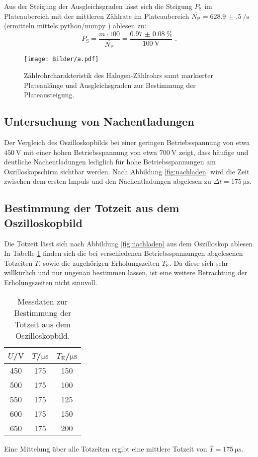 Aus der Steigung der Ausgleichsgraden lässt sich die Steigung $P_\mathrm{S}$ im Plateaubereich mit der mittleren Zählrate im Plateaubereich $\overline{N_\mathrm{P}}=\SI{628.9(5)}{\per\second}$ (ermitteln mittels python/numpy \cite{numpy}) ablesen zu:
\begin{equation*}
  P_\mathrm{S}=\frac{m \cdot 100} {\overline{N_\mathrm{P}}}= \frac{\SI{0.97(8)}{\percent}}{\SI{100}{\volt}}\text{ .}
\end{equation*}
\begin{figure}
  \centering
  \texttt{[image: Bilder/a.pdf]}
  \caption{Zählrohrcharakteristik des Halogen-Zählrohrs samt markierter Plateaulänge und Ausgleichsgraden zur Bestimmung der Plateausteigung.}
  \label{fig:a}
\end{figure}
\FloatBarrier

\subsection{Untersuchung von Nachentladungen}
Der Vergleich des Oszilloskopbilds bei einer geringen Betriebsspannung von etwa $\SI{450}{\volt}$ mit einer hohen Betriebsspannung von etwa $\SI{700}{\volt}$ zeigt, dass häufige und deutliche Nachentladungen lediglich für hohe Betriebsspannungen am Oszilloskopschirm sichtbar werden.
Nach Abbildung \ref{fig:nachladen} wird die Zeit zwischen dem ersten Impuls und den Nachentladungen abgelesen zu $\Delta t=\SI{175}{\micro\second}$.


\subsection{Bestimmung der Totzeit aus dem Oszilloskopbild}
Die Totzeit lässt sich nach Abbildung \ref{fig:nachladen} aus dem Oszilloskop ablesen.
In Tabelle \ref{tab:c} finden sich die bei verschiedenen Betriebsspannungen abgelesenen Totzeiten $T$, sowie die zugehörigen Erholungszeiten $T_\mathrm{E}$.
Da diese sich sehr willkürlich und nur ungenau bestimmen lassen, ist eine weitere Betrachtung der Erholungszeiten nicht sinnvoll.
\begin{table}
  \centering
  \caption{Messdaten zur Bestimmung der Totzeit aus dem Oszilloskopbild.}
  \label{tab:c}
\begin{tabular}{ccc}
  \toprule
$U$/$\si{\volt}$ & $T$/$\si{\micro\second}$ & $T_\mathrm{E}$/$\si{\micro\second}$ \\
\midrule
450  & 175  & 150  \\
500  & 175  & 100  \\
550  & 175  & 125  \\
600  & 175  & 150  \\
650  & 175  & 200  \\
\bottomrule
\end{tabular}
\end{table}
Eine Mittelung über alle Totzeiten ergibt eine mittlere Totzeit von $\overline{T}=\SI{175}{\micro\second}$.

